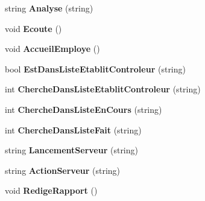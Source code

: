 \begin{DoxyCompactItemize}
\item 
\hypertarget{class_serveur_a770b3b736207e2e0f4e99a44e6dbfbcf}{string {\bfseries \-Analyse} (string)}\label{class_serveur_a770b3b736207e2e0f4e99a44e6dbfbcf}

\item 
\hypertarget{class_serveur_af4e624ed5818b967f99c5abbc966212c}{void {\bfseries \-Ecoute} ()}\label{class_serveur_af4e624ed5818b967f99c5abbc966212c}

\item 
\hypertarget{class_serveur_a4ebd92717a7ee46a363f5c1816a99f56}{void {\bfseries \-Accueil\-Employe} ()}\label{class_serveur_a4ebd92717a7ee46a363f5c1816a99f56}

\item 
\hypertarget{class_serveur_a5950c36f0775a3c5b01f22ceaa443171}{bool {\bfseries \-Est\-Dans\-Liste\-Etablit\-Controleur} (string)}\label{class_serveur_a5950c36f0775a3c5b01f22ceaa443171}

\item 
\hypertarget{class_serveur_a1d08a6af05112c72e679f9e2c7223850}{int {\bfseries \-Cherche\-Dans\-Liste\-Etablit\-Controleur} (string)}\label{class_serveur_a1d08a6af05112c72e679f9e2c7223850}

\item 
\hypertarget{class_serveur_a397592d70951ac24f178a2003bd369de}{int {\bfseries \-Cherche\-Dans\-Liste\-En\-Cours} (string)}\label{class_serveur_a397592d70951ac24f178a2003bd369de}

\item 
\hypertarget{class_serveur_a46e8318427a64d16018a7a210061991a}{int {\bfseries \-Cherche\-Dans\-Liste\-Fait} (string)}\label{class_serveur_a46e8318427a64d16018a7a210061991a}

\item 
\hypertarget{class_serveur_a5b54a380c06fa431c7adb18b6b7b9eda}{string {\bfseries \-Lancement\-Serveur} (string)}\label{class_serveur_a5b54a380c06fa431c7adb18b6b7b9eda}

\item 
\hypertarget{class_serveur_abc20e0793f7907e8d8b1596f6046aa47}{string {\bfseries \-Action\-Serveur} (string)}\label{class_serveur_abc20e0793f7907e8d8b1596f6046aa47}

\item 
\hypertarget{class_serveur_a36263ad96b1619d079ec49c54773496f}{void {\bfseries \-Redige\-Rapport} ()}\label{class_serveur_a36263ad96b1619d079ec49c54773496f}

\end{DoxyCompactItemize}
